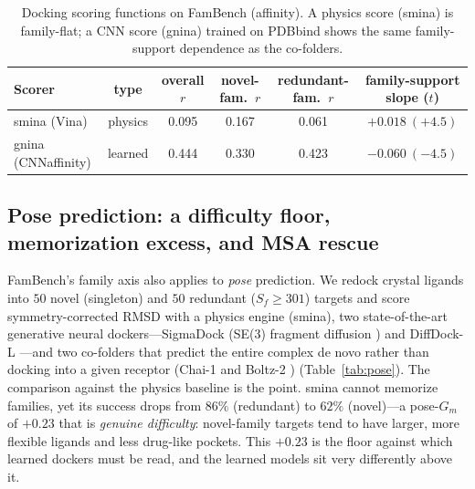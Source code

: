 \documentclass[11pt]{article}
\begin{document}
\begin{table}[t]
\centering\small
\caption{Docking scoring functions on FamBench (affinity). A physics score (smina) is family-flat;
a CNN score (gnina) trained on PDBbind shows the same family-support dependence as the co-folders.}
\label{tab:docking}
\begin{tabular}{lccccc}
\toprule
Scorer & type & overall $r$ & novel-fam.\ $r$ & redundant-fam.\ $r$ & family-support slope ($t$) \\
\midrule
smina (Vina) & physics      & 0.095 & 0.167 & 0.061 & $+0.018\ (+4.5)$ \\
gnina (CNNaffinity) & learned & 0.444 & 0.330 & 0.423 & $-0.060\ (-4.5)$ \\
\bottomrule
\end{tabular}
\end{table}

\subsection{Pose prediction: a difficulty floor, memorization excess, and MSA rescue}
\label{sec:pose}

FamBench's family axis also applies to \emph{pose} prediction. We redock crystal ligands into $50$
novel (singleton) and $50$ redundant ($S_f\ge301$) targets and score symmetry-corrected RMSD with a
physics engine (smina), two state-of-the-art generative neural dockers---SigmaDock (SE(3) fragment
diffusion \citep{prat2026sigmadock}) and DiffDock-L \citep{corso2024diffdockl}---and two co-folders
that predict the entire complex de novo rather than docking into a given receptor (Chai-1
\citep{chai2024chai1} and Boltz-2 \citep{passaro2025boltz2}) (Table~\ref{tab:pose}). The comparison
against the physics baseline is the point. smina cannot memorize families, yet its success drops from
$86\%$ (redundant) to $62\%$ (novel)---a pose-$G_m$ of $+0.23$ that is \emph{genuine difficulty}:
novel-family targets tend to have larger, more flexible ligands and less drug-like pockets. This
$+0.23$ is the floor against which learned dockers must be read, and the learned models sit very
differently above it.
\end{document}
